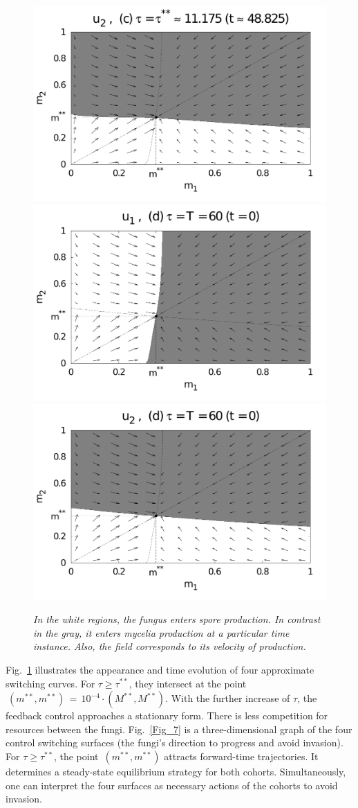 \documentclass[11pt]{amsart}
\begin{document}
\begin{figure}
{\includegraphics[width = 0.48 \textwidth]{figures/Figure_5c_2.pdf} \\
\includegraphics[width = 0.48 \textwidth]{figures/Figure_5d_1.pdf}
\includegraphics[width = 0.48 \textwidth]{figures/Figure_5d_2.pdf}
}
\bf \caption{\it In the white regions, the fungus enters spore production. In contrast in the gray, it enters mycelia production at a particular time instance. Also, the field corresponds to its velocity of production.
}
\label{Fig_5}
\end{figure}

Fig.~\ref{Fig_5} illustrates the appearance and time evolution of four
approximate switching curves. For $ \tau \geqslant \tau^{**} $, they intersect
at the point~$ \: \left( m^{**}, m^{**} \right) \, = \, 10^{-4}
\cdot \left( M^{**}, M^{**} \right) $. With the further increase of $ \tau $, the 
feedback control approaches a stationary form. There is less competition for resources between the fungi. Fig.~\ref{Fig_7}
is a three-dimensional graph of the 
four control switching surfaces (the fungi's direction to progress and avoid invasion). 
For $ \tau \geqslant \tau^{**} $, the point~$ \left( m^{**}, m^{**} \right) $
attracts forward-time trajectories. It determines a steady-state equilibrium
strategy for both cohorts. Simultaneously, one can interpret the four surfaces as necessary actions of the cohorts to avoid invasion.
\end{document}

